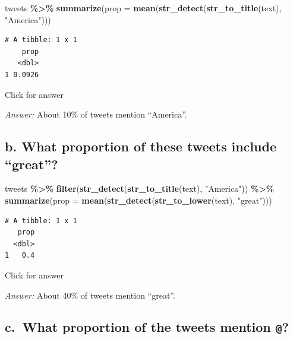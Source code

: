 \documentclass[
]{book}
\newenvironment{Shaded}{\begin{snugshade}}{\end{snugshade}}
\newcommand{\AttributeTok}[1]{\textcolor[rgb]{0.13,0.29,0.53}{#1}}
\newcommand{\FunctionTok}[1]{\textcolor[rgb]{0.13,0.29,0.53}{\textbf{#1}}}
\newcommand{\NormalTok}[1]{#1}
\newcommand{\SpecialCharTok}[1]{\textcolor[rgb]{0.81,0.36,0.00}{\textbf{#1}}}
\newcommand{\StringTok}[1]{\textcolor[rgb]{0.31,0.60,0.02}{#1}}
\begin{document}
\begin{Shaded}
\begin{Highlighting}[]
\NormalTok{tweets }\SpecialCharTok{\%\textgreater{}\%} 
  \FunctionTok{summarize}\NormalTok{(}\AttributeTok{prop =} \FunctionTok{mean}\NormalTok{(}\FunctionTok{str\_detect}\NormalTok{(}\FunctionTok{str\_to\_title}\NormalTok{(text), }\StringTok{"America"}\NormalTok{))) }
\end{Highlighting}
\end{Shaded}

\begin{verbatim}
# A tibble: 1 x 1
    prop
   <dbl>
1 0.0926
\end{verbatim}

Click for answer

\emph{Answer:} About 10\% of tweets mention ``America''.

\hypertarget{b.-what-proportion-of-these-tweets-include-great}{%
\subsection{b. What proportion of these tweets include ``great''?}\label{b.-what-proportion-of-these-tweets-include-great}}

\begin{Shaded}
\begin{Highlighting}[]
\NormalTok{tweets }\SpecialCharTok{\%\textgreater{}\%} \FunctionTok{filter}\NormalTok{(}\FunctionTok{str\_detect}\NormalTok{(}\FunctionTok{str\_to\_title}\NormalTok{(text), }\StringTok{"America"}\NormalTok{)) }\SpecialCharTok{\%\textgreater{}\%}
  \FunctionTok{summarize}\NormalTok{(}\AttributeTok{prop =} \FunctionTok{mean}\NormalTok{(}\FunctionTok{str\_detect}\NormalTok{(}\FunctionTok{str\_to\_lower}\NormalTok{(text), }\StringTok{"great"}\NormalTok{))) }
\end{Highlighting}
\end{Shaded}

\begin{verbatim}
# A tibble: 1 x 1
   prop
  <dbl>
1   0.4
\end{verbatim}

Click for answer

\emph{Answer:} About 40\% of tweets mention ``great''.

\hypertarget{c.-what-proportion-of-the-tweets-mention}{%
\subsection{\texorpdfstring{c.~What proportion of the tweets mention \texttt{@}?}{c.~What proportion of the tweets mention @?}}\label{c.-what-proportion-of-the-tweets-mention}}
\end{document}
